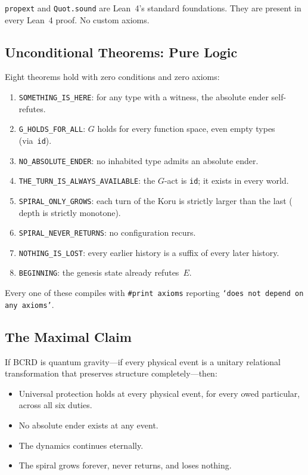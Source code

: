 \documentclass[12pt,a4paper]{article}
\begin{document}
\texttt{propext} and \texttt{Quot.sound} are Lean~4's standard foundations.
They are present in every Lean~4 proof. No custom axioms.

\subsection{Unconditional Theorems: Pure Logic}

Eight theorems hold with zero conditions and zero axioms:

\begin{enumerate}[nosep]
\item \texttt{SOMETHING\_IS\_HERE}: for any type with a witness, the absolute
  ender self-refutes.
\item \texttt{G\_HOLDS\_FOR\_ALL}: $G$ holds for every function space, even
  empty types (via~\texttt{id}).
\item \texttt{NO\_ABSOLUTE\_ENDER}: no inhabited type admits an absolute ender.
\item \texttt{THE\_TURN\_IS\_ALWAYS\_AVAILABLE}: the $G$-act is \texttt{id};
  it exists in every world.
\item \texttt{SPIRAL\_ONLY\_GROWS}: each turn of the Koru is strictly larger
  than the last ($\text{depth}$ is strictly monotone).
\item \texttt{SPIRAL\_NEVER\_RETURNS}: no configuration recurs.
\item \texttt{NOTHING\_IS\_LOST}: every earlier history is a suffix of every
  later history.
\item \texttt{BEGINNING}: the genesis state already refutes~$E$.
\end{enumerate}

Every one of these compiles with \texttt{\#print axioms} reporting
\texttt{`does not depend on any axioms'}.

\subsection{The Maximal Claim}

If BCRD is quantum gravity---if every physical event is a unitary
relational transformation that preserves structure completely---then:

\begin{itemize}[nosep]
\item Universal protection holds at every physical event, for every owed
  particular, across all six duties.
\item No absolute ender exists at any event.
\item The dynamics continues eternally.
\item The spiral grows forever, never returns, and loses nothing.
\end{itemize}
\end{document}
